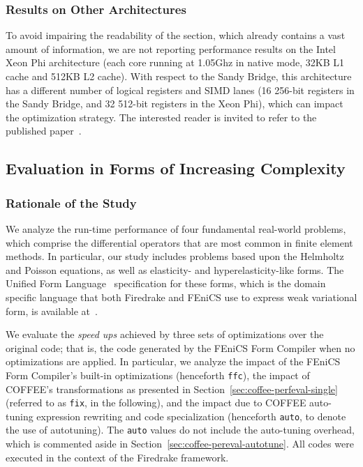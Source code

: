 \subsubsection*{Results on Other Architectures}
To avoid impairing the readability of the section, which already contains a vast amount of information, we are not reporting performance results on the Intel Xeon Phi  architecture (each core running at 1.05Ghz in native mode, 32KB L1 cache and 512KB L2 cache). With respect to the Sandy Bridge, this architecture has a different number of logical registers and SIMD lanes (16 256-bit registers in the Sandy Bridge, and 32 512-bit registers in the Xeon Phi), which can impact the optimization strategy. The interested reader is invited to refer to the published paper~\citep{Luporini-coffee}.

\subsection{Evaluation in Forms of Increasing Complexity}
\label{sec:coffee-perfeval-allforms}

\subsubsection{Rationale of the Study}
\label{sec:coffee-allforms-rationale}
We analyze the run-time performance of four fundamental real-world problems, which comprise the differential operators that are most common in finite element methods. In particular, our study includes problems based upon the Helmholtz and Poisson equations, as well as elasticity- and hyperelasticity-like forms. The Unified Form Language~\cite{ufl} specification for these forms, which is the domain specific language that both Firedrake and FEniCS use to express weak variational form, is available at~\cite{ufl-code}. 

We evaluate the \textit{speed ups} achieved by three sets of optimizations over the original code; that is, the code generated by the FEniCS Form Compiler when no optimizations are applied. In particular, we analyze the impact of the FEniCS Form Compiler's built-in optimizations (henceforth \texttt{ffc}), the impact of COFFEE's transformations as presented in Section~\ref{sec:coffee-perfeval-single} (referred to as \texttt{fix}, in the following), and the impact due to COFFEE auto-tuning expression rewriting and code specialization (henceforth \texttt{auto}, to denote the use of autotuning). The \texttt{auto} values do not include the auto-tuning overhead, which is commented aside in Section~\ref{sec:coffee-pereval-autotune}. All codes were executed in the context of the Firedrake framework.

